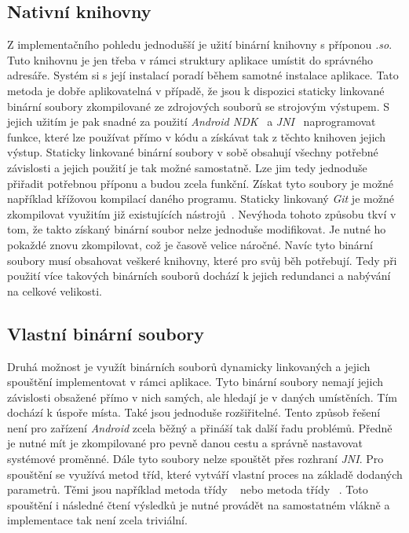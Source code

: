     \subsection{Nativní knihovny}
    Z implementačního pohledu jednodušší je užití binární knihovny s příponou \emph{.so}. Tuto knihovnu je jen třeba v rámci struktury aplikace umístit do správného adresáře. Systém si s její instalací poradí během samotné instalace aplikace. Tato metoda je dobře aplikovatelná v případě, že jsou k dispozici staticky linkované binární soubory zkompilované ze zdrojových souborů se strojovým výstupem. S jejich užitím je pak snadné za použití \emph{Android NDK}~ a \emph{JNI}~ naprogramovat funkce, které lze používat přímo v kódu a získávat tak z těchto knihoven jejich výstup. Staticky linkované binární soubory v sobě obsahují všechny potřebné závislosti a jejich použití je tak možné samostatně. Lze jim tedy jednoduše přiřadit potřebnou příponu a budou zcela funkční. Získat tyto soubory je možné například křížovou kompilací daného programu. Staticky linkovaný \emph{Git} je možné zkompilovat využitím již existujících nástrojů~. Nevýhoda tohoto způsobu tkví v tom, že takto získaný binární soubor nelze jednoduše modifikovat. Je nutné ho pokaždé znovu zkompilovat, což je časově velice náročné. Navíc tyto binární soubory musí obsahovat veškeré knihovny, které pro svůj běh potřebují. Tedy při použití více takových binárních souborů dochází k jejich redundanci a nabývání na celkové velikosti.

    \newpage
    \subsection{Vlastní binární soubory}\label{subsec:dyn_binaries}
    Druhá možnost je využít binárních souborů dynamicky linkovaných a jejich spouštění implementovat v rámci aplikace. Tyto binární soubory nemají jejich závislosti obsažené přímo v nich samých, ale hledají je v daných umístěních. Tím dochází k úspoře místa. Také jsou jednoduše rozšiřitelné. Tento způsob řešení není pro zařízení \emph{Android} zcela běžný a přináší tak další řadu problémů. Předně je nutné mít je zkompilované pro pevně danou cestu a správně nastavovat systémové proměnné. Dále tyto soubory nelze spouštět přes rozhraní \emph{JNI}. Pro spouštění se využívá metod tříd, které vytváří vlastní proces na základě dodaných parametrů. Těmi jsou například metoda  třídy ~ nebo metoda  třídy ~. Toto spouštění i následné čtení výsledků je nutné provádět na samostatném vlákně a implementace tak není zcela triviální.

